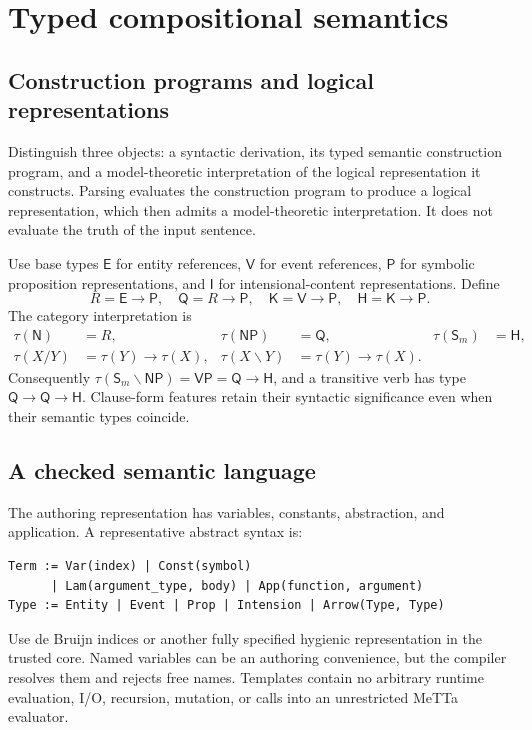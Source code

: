 \documentclass[11pt,a4paper]{article}
\newcommand{\E}{\mathsf{E}}
\newcommand{\V}{\mathsf{V}}
\newcommand{\Prop}{\mathsf{P}}
\newcommand{\Int}{\mathsf{I}}
\newcommand{\Q}{\mathsf{Q}}
\newcommand{\HH}{\mathsf{H}}
\newcommand{\KK}{\mathsf{K}}
\newcommand{\VP}{\mathsf{VP}}
\newcommand{\NP}{\mathsf{NP}}
\newcommand{\NC}{\mathsf{N}}
\begin{document}
\section{Typed compositional semantics}\label{sec:semantics}

\subsection{Construction programs and logical representations}
Distinguish three objects: a syntactic derivation, its typed semantic
construction program, and a model-theoretic interpretation of the logical
representation it constructs. Parsing evaluates the construction program to produce a logical
representation, which then admits a model-theoretic interpretation. It does
not evaluate the truth of the input sentence.

Use base types \(\E\) for entity references, \(\V\) for event references,
\(\Prop\) for symbolic proposition representations, and \(\Int\) for
intensional-content representations. Define
\begin{equation}
 R=\E\to\Prop,\quad
 \Q=R\to\Prop,\quad
 \KK=\V\to\Prop,\quad
 \HH=\KK\to\Prop .
 \label{eq:types}
\end{equation}
The category interpretation is
\begin{align}
 \tau(\NC)&=R,&
 \tau(\NP)&=\Q,&
 \tau(\mathsf S_m)&=\HH,\\
 \tau(X/Y)&=\tau(Y)\to\tau(X),&
 \tau(X\backslash Y)&=\tau(Y)\to\tau(X).
\end{align}
Consequently \(\tau(\mathsf S_m\backslash\NP)=\VP=\Q\to\HH\), and a
transitive verb has type \(\Q\to\Q\to\HH\).
Clause-form features retain their syntactic significance even when their
semantic types coincide.

\subsection{A checked semantic language}
The authoring representation has variables, constants, abstraction, and
application. A representative abstract syntax is:
\begin{lstlisting}
Term := Var(index) | Const(symbol)
      | Lam(argument_type, body) | App(function, argument)
Type := Entity | Event | Prop | Intension | Arrow(Type, Type)
\end{lstlisting}
Use de Bruijn indices or another fully specified hygienic representation in
the trusted core. Named variables can be an authoring convenience, but the
compiler resolves them and rejects free names. Templates contain no arbitrary
runtime evaluation, I/O, recursion, mutation, or calls into an unrestricted
MeTTa evaluator.
\end{document}
